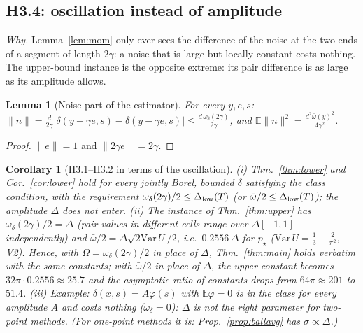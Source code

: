\documentclass[11pt,a4paper]{article}
\numberwithin{equation}{section}
\newtheorem{lemma}[theorem]{Lemma}
\newtheorem{corollary}[theorem]{Corollary}
\theoremstyle{definition}
\theoremstyle{remark}
\newcommand{\E}{\mathbb E}\newcommand{\R}{\mathbb R}\newcommand{\Z}{\mathbb Z}\newcommand{\Prob}{\mathbb P}
\newcommand{\norm}[1]{\lVert #1\rVert}\newcommand{\abs}[1]{\lvert #1\rvert}\newcommand{\ip}[2]{\langle #1,#2\rangle}
\newcommand{\wbar}{\bar\omega}\newcommand{\Atwo}{\cA^{\rm 2pt}_\gamma}
\begin{document}
\subsection{H3.4: oscillation instead of amplitude}\label{sec:osc}
\emph{Why.} Lemma~\ref{lem:mom} only ever sees the difference of the noise at the two ends of a segment of length $2\gamma$: a noise that is large but locally constant costs nothing. The upper-bound instance is the opposite extreme: its pair difference is as large as its amplitude allows.

\begin{lemma}[Noise part of the estimator]\label{lem:osc}
For every $y,e,s$: $\norm n=\frac d{2\gamma}\abs{\delta(y+\gamma e,s)-\delta(y-\gamma e,s)}\le\frac{d\,\omega_\delta(2\gamma)}{2\gamma}$, and $\E\norm n^2=\frac{d^2\wbar(y)^2}{4\gamma^2}$.
\end{lemma}
\begin{proof}
$\norm e=1$ and $\norm{2\gamma e}=2\gamma$.
\end{proof}

\begin{corollary}[H3.1--H3.2 in terms of the oscillation]\label{cor:osc}
(i) Thm.~\ref{thm:lower} and Cor.~\ref{cor:lower} hold for every jointly Borel, bounded $\delta$ satisfying the class condition, with the requirement $\omega_\delta(2\gamma)/2\le\Delta_{\rm low}(T)$ (or $\wbar/2\le\Dlow(T)$); the amplitude $\Delta$ does not enter. (ii) The instance of Thm.~\ref{thm:upper} has $\omega_\delta(2\gamma)/2=\Delta$ (pair values in different cells range over $\Delta[-1,1]$ independently) and $\wbar/2=\Delta\sqrt{2\mathrm{Var}\,U}/2$, i.e.\ $0.2556\,\Delta$ for $p_\star$ ($\mathrm{Var}\,U=\frac13-\frac2{\pi^2}$, V2). Hence, with $\Omega=\omega_\delta(2\gamma)/2$ in place of $\Delta$, Thm.~\ref{thm:main} holds verbatim with the same constants; with $\wbar/2$ in place of $\Delta$, the upper constant becomes $32\pi\cdot0.2556\approx25.7$ and the asymptotic ratio of constants drops from $64\pi\approx201$ to $51.4$. (iii) Example: $\delta(x,s)=A\varphi(s)$ with $\E\varphi=0$ is in the class for every amplitude $A$ and costs nothing ($\omega_\delta=0$): $\Delta$ is not the right parameter for two-point methods. (For one-point methods it is: Prop.~\ref{prop:ballavg} has $\sigma\propto\Delta$.)
\end{corollary}
\end{document}
